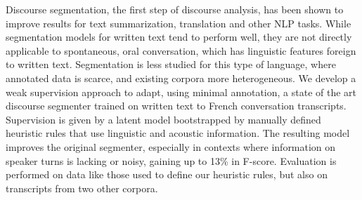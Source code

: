 Discourse segmentation, the first step of discourse analysis, has been shown to improve results for text summarization,  translation and other NLP tasks. While segmentation models for written text  tend to perform well, they are not directly applicable to spontaneous, oral conversation, which has linguistic features foreign to written text.  Segmentation is less studied for this type of language, where annotated data is scarce, and existing corpora more heterogeneous. We develop a weak supervision approach to adapt, using minimal annotation, a state of the art discourse segmenter trained on written text to French conversation transcripts. Supervision is given by a latent model bootstrapped by manually defined heuristic rules that use  linguistic and acoustic information. The resulting model improves the original segmenter, especially in contexts where information on speaker turns is lacking or noisy, gaining up to 13\% in F-score. Evaluation is performed on data like those used to define our heuristic rules, but also on  transcripts from two other  corpora.
